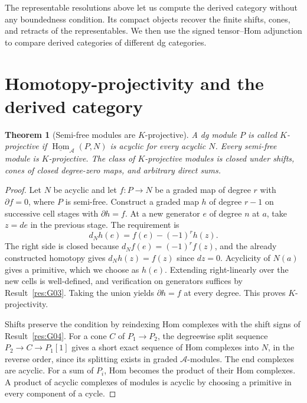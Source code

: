 \documentclass[11pt,oneside,openany]{book}
\newtheorem{theorem}{Theorem}[chapter]
\theoremstyle{definition}
\theoremstyle{remark}
\begin{document}
The representable resolutions above let us compute the derived
category without any boundedness condition. Its compact objects
recover the finite shifts, cones, and retracts of the representables.
We then use the signed tensor--Hom adjunction to compare derived
categories of different dg categories.

\section{Homotopy-projectivity and the derived category}

\begin{theorem}[Semi-free modules are \(K\)-projective]\label{res:G07}
A dg module \(P\) is called \(K\)-projective if
\(\underline{\operatorname{Hom}}_{\mathcal A}(P,N)\) is acyclic for
every acyclic \(N\). Every semi-free module is \(K\)-projective.
The class of \(K\)-projective modules is closed under shifts,
cones of closed degree-zero maps, and arbitrary direct sums.
\end{theorem}
\begin{proof}
Let \(N\) be acyclic and let \(f:P\to N\) be a graded map of
degree \(r\) with \(\partial f=0\), where \(P\) is semi-free.
Construct a graded map \(h\) of degree \(r-1\) on successive
cell stages with \(\partial h=f\). At a new generator \(e\)
of degree \(n\) at \(a\), take \(z=de\) in the previous stage.
The requirement is
\[
          d_N h(e)= f(e)-(-1)^r h(z).
\]
The right side is closed because
\(d_N f(e)=(-1)^r f(z)\), and the already constructed homotopy
gives \(d_N h(z)=f(z)\) since \(dz=0\). Acyclicity of \(N(a)\)
gives a primitive, which we choose as \(h(e)\). Extending
right-linearly over the new cells is well-defined, and verification
on generators suffices by Result~\ref{res:G03}. Taking the union yields
\(\partial h=f\) at every degree. This proves \(K\)-projectivity.

Shifts preserve the condition by reindexing Hom complexes with
the shift signs of Result~\ref{res:G04}. For a cone \(C\) of
\(P_1\to P_2\), the degreewise split sequence
\(P_2\to C\to P_1[1]\) gives a short exact sequence of Hom complexes
into \(N\), in the reverse order, since its splitting exists
in graded \(\mathcal A\)-modules. The end complexes are acyclic.
For a sum of \(P_i\), Hom becomes the product of their Hom
complexes. A product of acyclic complexes of modules is acyclic
by choosing a primitive in every component of a cycle.
\end{proof}
\end{document}
